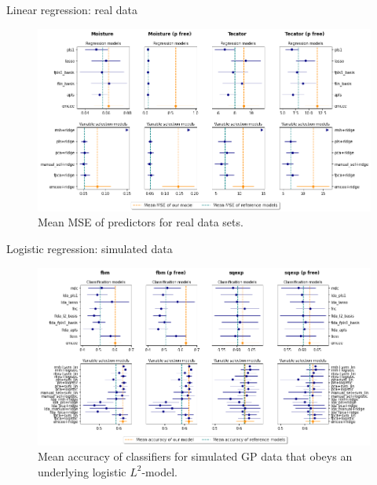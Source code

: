 \documentclass[10pt, english, professionalfonts]{beamer}
\begin{document}
\begin{frame}{Linear regression: real data}
    \vspace{1em}
  \begin{figure}
    \includegraphics[width=\textwidth]{img/reg_emcee_real}
    \caption{Mean MSE of predictors for real data sets.}
  \end{figure}
\end{frame}

\begin{frame}{Logistic regression: simulated data}
    \vspace{1em}
  \begin{figure}
    \includegraphics[width=\textwidth]{img/clf_emcee_l2}
    \caption{Mean accuracy of classifiers for simulated GP data that obeys an underlying logistic \(L^2\)-model.}
  \end{figure}
\end{frame}
\end{document}

